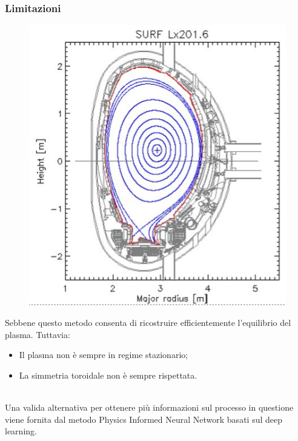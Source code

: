 \documentclass{beamer}
\begin{document}
\begin{frame}
	\frametitle{Limitazioni}
	\begin{minipage}[t]{0.45\textwidth}
		\begin{figure}
			\includegraphics[scale=0.4]{2022-06-07-13-17-56.png}%
		\end{figure}
	\end{minipage}
	\begin{minipage}[t]{0.45\textwidth}
		Sebbene questo metodo consenta di ricostruire efficientemente l'equilibrio del plasma. Tuttavia:\begin{itemize}
			\item Il plasma non è sempre in regime stazionario;
			\item La simmetria toroidale non è sempre rispettata.
		\end{itemize}
	\end{minipage}\\
	\medskip
	Una valida alternativa per ottenere più informazioni sul processo in questione viene fornita dal metodo Physics Informed Neural Network basati sul deep learning.
\end{frame}
\end{document}
